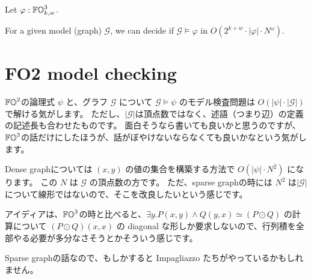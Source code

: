 
\setcounter{tempTheoremCounter}{\value{theorem}}
\begin{theorem}[Restatement]
Let $\varphi : \mathbb{FO}^3_{k, w}$.

For a given model (graph) $\mathcal{G}$,
we can decide if $\mathcal{G} \models \varphi$ in $O(2^{k+w} \cdot |\varphi| \cdot N^{\omega})$.
\end{theorem}
\setcounter{theorem}{\value{tempTheoremCounter}}

\section{FO2 model checking}

\begin{Jcomment}
    $\mathbb{FO}^2$の論理式 $\psi$ と、グラフ $\mathcal{G}$ について
    $\mathcal{G} \models \psi$ のモデル検査問題は
    $O(|\psi| \cdot |\mathcal{G}|)$ で解ける気がします。
    ただし、$|\mathcal{G}|$は頂点数ではなく、述語（つまり辺）の定義の記述長も合わせたものです。
    面白そうなら書いても良いかと思うのですが、$\mathbb{FO}^3$の話だけにしたほうが、話がぼやけないならなくても良いかなという気がします。

    Dense graphについては $(x, y)$ の値の集合を構築する方法で $O(|\psi| \cdot N^2)$ になります。
    この $N$ は $\mathcal{G}$ の頂点数の方です。
    ただ、sparse graphの時には $N^2$ は$|\mathcal{G}|$について線形ではないので、そこを改良したいという感じです。

    アイディアは、$\mathbb{FO}^3$の時と比べると、$\exists y. P(x, y) \land Q(y, x) \simeq (P \odot Q)$ の計算について $(P \odot Q)(x, x)$ の diagonal な形しか要求しないので、行列積を全部やる必要が多分なさそうとかそういう感じです。

    Sparse graphの話なので、もしかすると Impagliazzo たちがやっているかもしれません。
\end{Jcomment}

\begin{yoshiki}
\end{yoshiki}